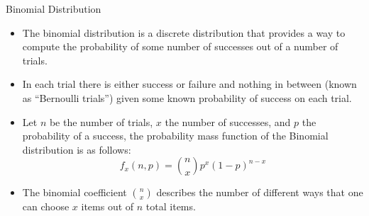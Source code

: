 \documentclass[handout]{beamer}
\begin{document}
\begin{frame}{Binomial Distribution}

\scriptsize{
\begin{itemize}
 \item  The binomial distribution is a discrete distribution that provides a way to compute the probability of some number of successes out of a number of trials.
 \item In each trial there is either success or failure and nothing in between (known as “Bernoulli trials”) given some known probability of success on each trial.
 \item Let $n$ be the number of trials, $x$ the number of successes, and $p$ the probability of a success, the probability mass function of the Binomial distribution is as follows:
 \begin{displaymath}
  f_x(n,p)= {n \choose x}p^{x}(1-p)^{n-x} 
 \end{displaymath}
\item The binomial coefficient ${n \choose x}$ describes the number of different ways that one can choose $x$ items out of $n$ total items.
 
 
 \end{itemize}}
 
 \end{frame}
 
 
\end{document}
